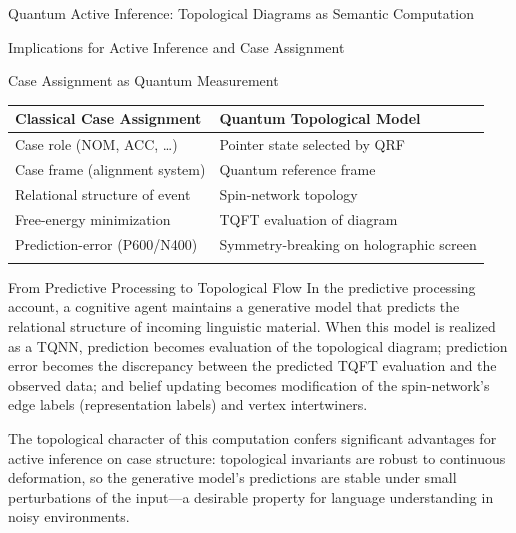 \documentclass[
  ignorenonframetext,
]{beamer}
\newcounter{none} %
\begin{document}
\begin{frame}{Quantum Active Inference: Topological Diagrams as Semantic
Computation}
\begin{block}{Implications for Active Inference and Case Assignment}
\begin{block}{Case Assignment as Quantum Measurement}
{\def\LTcaptype{none} %
\begin{longtable}[]{@{}
  >{\raggedright\arraybackslash}p{}
  >{\raggedright\arraybackslash}p{}@{}}
\toprule\noalign{}
\begin{minipage}[b]{\linewidth}\raggedright
Classical Case Assignment
\end{minipage} & \begin{minipage}[b]{\linewidth}\raggedright
Quantum Topological Model
\end{minipage} \\
\midrule\noalign{}
\endhead
Case role (NOM, ACC, \ldots) & Pointer state selected by QRF \\
Case frame (alignment system) & Quantum reference frame \\
Relational structure of event & Spin-network topology \\
Free-energy minimization & TQFT evaluation of diagram \\
Prediction-error (P600/N400) & Symmetry-breaking on holographic
screen \\
\bottomrule\noalign{}
\end{longtable}
}
\end{block}

\begin{block}{From Predictive Processing to Topological Flow}
\protect{}\label{from-predictive-processing-to-topological-flow}
In the predictive processing account, a cognitive agent maintains a
generative model that predicts the relational structure of incoming
linguistic material. When this model is realized as a TQNN, prediction
becomes evaluation of the topological diagram; prediction error becomes
the discrepancy between the predicted TQFT evaluation and the observed
data; and belief updating becomes modification of the spin-network's
edge labels (representation labels) and vertex intertwiners.

The topological character of this computation confers significant
advantages for active inference on case structure: topological
invariants are robust to continuous deformation, so the generative
model's predictions are stable under small perturbations of the
input---a desirable property for language understanding in noisy
environments.
\end{block}


\end{block}
\end{frame}
\end{document}

